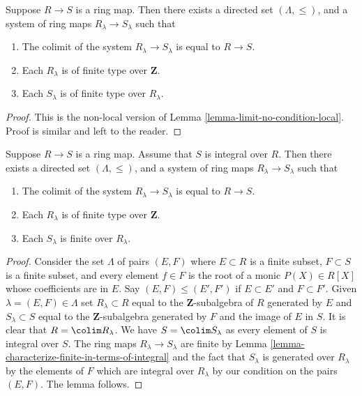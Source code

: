 \begin{lemma}
\label{lemma-limit-no-condition}
Suppose $R \to S$ is a ring map.
Then there exists a directed set $(\Lambda, \leq)$, and
a system of ring maps $R_\lambda \to S_\lambda$
such that
\begin{enumerate}
\item The colimit of the system $R_\lambda \to S_\lambda$
is equal to $R \to S$.
\item Each $R_\lambda$ is of finite type
over $\mathbf{Z}$.
\item Each $S_\lambda$ is of finite type
over $R_\lambda$.
\end{enumerate}
\end{lemma}

\begin{proof}
This is the non-local version of
Lemma \ref{lemma-limit-no-condition-local}.
Proof is similar and left to the reader.
\end{proof}

\begin{lemma}
\label{lemma-limit-integral}
Suppose $R \to S$ is a ring map.
Assume that $S$ is integral over $R$.
Then there exists a directed set $(\Lambda, \leq)$, and
a system of ring maps $R_\lambda \to S_\lambda$
such that
\begin{enumerate}
\item The colimit of the system $R_\lambda \to S_\lambda$
is equal to $R \to S$.
\item Each $R_\lambda$ is of finite type
over $\mathbf{Z}$.
\item Each $S_\lambda$ is finite over $R_\lambda$.
\end{enumerate}
\end{lemma}

\begin{proof}
Consider the set $\Lambda$ of pairs $(E, F)$ where $E \subset R$
is a finite subset, $F \subset S$ is a finite subset, and
every element $f \in F$ is the root of a monic $P(X) \in R[X]$
whose coefficients are in $E$. Say $(E, F) \leq (E', F')$
if $E \subset E'$ and $F \subset F'$.
Given $\lambda = (E, F) \in \Lambda$ set $R_\lambda \subset R$ equal
to the $\mathbf{Z}$-subalgebra of $R$ generated by $E$ and
$S_\lambda \subset S$ equal to the $\mathbf{Z}$-subalgebra generated by
$F$ and the image of $E$ in $S$. It is clear that $R = \colim R_\lambda$.
We have $S = \colim S_\lambda$ as every element of $S$ is integral
over $S$. The ring maps $R_\lambda \to S_\lambda$ are finite by
Lemma \ref{lemma-characterize-finite-in-terms-of-integral} and the fact that
$S_\lambda$ is generated over $R_\lambda$ by the elements of
$F$ which are integral over $R_\lambda$ by our condition on the
pairs $(E, F)$. The lemma follows.
\end{proof}

